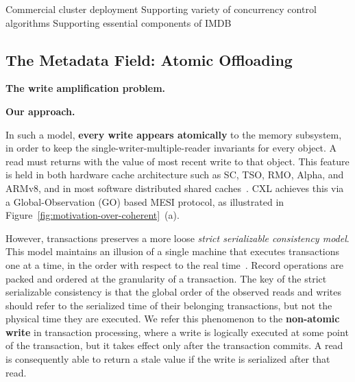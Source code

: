 \ifx\stale\undefined
Commercial cluster deployment
Supporting variety of concurrency control algorithms
Supporting essential components of IMDB
\fi



\ifx\stale\undefined

\subsection{The Metadata Field: Atomic Offloading}

\noindent \textbf{The write amplification problem. }

\noindent \textbf{Our approach. }

\fi

\ifx\stale\undefined

In such a model, \textbf{every write appears atomically} to the memory subsystem, in order to keep the single-writer-multiple-reader invariants for every object. A read must returns with the value of most recent write to that object. 
This feature is held in both hardware cache architecture such as SC, TSO, RMO, Alpha, and ARMv8, and in most software distributed shared caches~\cite{gam, }. CXL achieves this via a Global-Observation (GO) based MESI protocol, as illustrated in Figure~\ref{fig:motivation-over-coherent}~(a). 

However, transactions preserves a more loose \textit{strict serializable consistency model}.  This model maintains an illusion of a single machine that executes transactions one at a time, in the order with respect to the real time~\cite{farm, drtm, compromise, timestone_asplos20, calvin_sigmod12, cicadia_sigmod17, tm_book, rss_sosp21, hekaton_sigmod13}. Record operations are packed and ordered at the granularity of a transaction. The key of the strict serializable consistency is that the global order of the observed reads and writes~\cite{rss_sosp21, acid_79} should refer to the serialized time of their belonging transactions, but not the physical time they are executed. 
We refer this phenomenon to the \textbf{non-atomic write} in transaction processing, where a write is logically executed at some point of the transaction, but it takes effect only after the transaction commits. 
A read is consequently able to return a stale value if the write is serialized after that read. 

